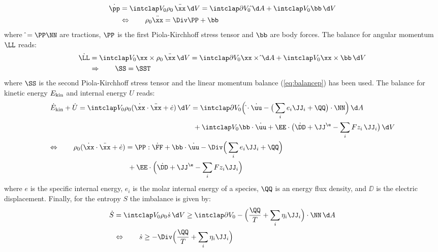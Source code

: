 \begin{align}
  \begin{aligned}
    \dot \pp  & = \intVO \rho_0 \,\ddot\xx \dV = \intdVO \hat\tt \dA + \intVO \bb \dV \\
              & \Leftrightarrow  \qquad \rho_0 \ddot\xx = \Div\PP + \bb
    \label{eq:balancep}
  \end{aligned}
\end{align}
where $\hat\tt=\PP\NN$ are tractions, $\PP$ is the first Piola-Kirchhoff stress tensor and $\bb$ are body forces. The balance for angular momentum $\LL$ reads:
\begin{align}
  \begin{aligned}
    \dot \LL  &= \intVO \xx \times \rho_0 \,\ddot\xx \dV  = \intdVO \xx \times \hat\tt \dA + \intVO \xx \times \bb \dV\\
              &\Rightarrow \qquad \SS = \SST
  \end{aligned}
\end{align}
where $\SS$ is the second Piola-Kirchhoff stress tensor and the linear momentum balance (\cref{eq:balancep}) has been used. The balance for  kinetic energy $E_{\rm kin}$ and internal energy $U$ reads: 
\begin{align}
  \begin{aligned}
  &\begin{aligned}
  \dot E_{\rm kin} + \dot U = \intVO \rho_0(\dot\xx\cdot\ddot\xx + \dot e) \dV &= \intdVO \Big(\hat\tt\cdot\dot\uu -\big(\sum_i e_i \JJ_i+\QQ\big) \cdot \NN \Big) \dA \\
          & \ + \intVO \bb\cdot \dot\uu + \EE\cdot\big(\dot\DD+\JJ^\e-\sum_i Fz_i\,\JJ_i\big) \dV \\
  \end{aligned} \\
  &\begin{aligned}
    \Leftrightarrow \qquad \rho_0(\dot\xx\cdot\ddot\xx+\dot e) &= \PP:\dot\FF + \bb \cdot \dot\uu - \Div\Big(\sum_i e_i \JJ_i+ \QQ \Big) \\
    & \ + \EE\cdot\Big(\dot \DD+\JJ^\e-\sum_i Fz_i\JJ_i\Big) 
  \end{aligned}
  \end{aligned}
\end{align}
where $e$ is the specific internal energy, $e_i$ is the molar internal energy of a species, $\QQ$ is an energy flux density, and $\DD$ is the electric displacement. Finally, for the entropy $S$ the imbalance is given by: 
\begin{align}
  \begin{aligned}
    \dot S & = \intVO \rho_0 \dot s \dV \geq \intdVO -\Big(\frac{\QQ}{T} + \sum_i \eta_i\JJ_i\Big) \cdot \NN \dA \\
           & \Leftrightarrow \qquad \dot s \geq -\Div\Big(\frac{\QQ}{T}+\sum_i \eta_i \JJ_i \Big)
  \end{aligned}
\end{align}
